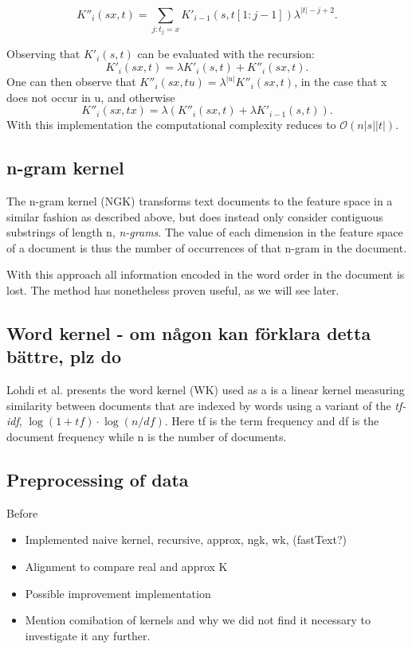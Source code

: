 \begin{equation*}\label{key}
K''_i(sx,t) = \sum_{j:t_j = x}K'_{i-1}(s,t[1:j-1])\lambda^{|t|-j+2}.
\end{equation*}

Observing that $ K'_i(s,t) $ can be evaluated with the recursion:
\begin{equation*}\label{key}
K'_i(sx,t) = \lambda K'_i(s,t) + K''_i(sx,t).
\end{equation*}
One can then observe that $ K''_i(sx,tu) = \lambda^{|u|}K''_i(sx,t)$, in the case that x does not occur in u, and otherwise 
\begin{equation*}\label{key}
K''_i(sx,tx) = \lambda \left( K''_i(sx,t) + \lambda K'_{i-1}(s,t) \right).
\end{equation*} 
With this implementation the computational complexity reduces to $ \mathcal{O}(n|s||t|) $.

\subsection{n-gram kernel}
The n-gram kernel (NGK) transforms text documents to the feature space in a similar fashion as described above, but does instead only consider contiguous substrings of length n, \textit{n-grams}. The value of each dimension in the feature space of a document is thus the number of occurrences of that n-gram in the document. 

With this approach all information encoded in the word order in the document is lost. The method has nonetheless proven useful, as we will see later.

\subsection{Word kernel - om någon kan förklara detta bättre, plz do}
Lohdi et al. presents the word kernel (WK) used as a is a linear kernel measuring similarity between documents that are indexed by words using a variant of the \textit{tf-idf}, $ \log(1+tf) \cdot \log(n/df) $. Here tf is the term frequency and df is the document frequency while n is the number of documents. 


\subsection{Preprocessing of data}
Before 



\begin{itemize}
	\item Implemented naive kernel, recursive, approx, ngk, wk, (fastText?)
	
	\item Alignment to compare real and approx K
	
	\item Possible improvement implementation 
	
	\item Mention comibation of kernels and why we did not find it necessary to investigate it any further. 
	
\end{itemize}

